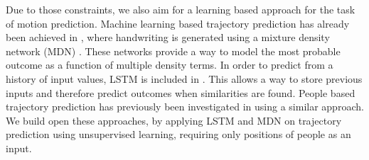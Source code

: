 Due to those constraints, we also aim for a learning based approach for the task of motion prediction.
Machine learning based trajectory prediction has already been achieved in \cite{graves2013generating}, where handwriting is generated using a mixture density network (MDN) \cite{bishop1994mixture}. 
These networks provide a way to model the most probable outcome as a function of multiple density terms. 
In order to predict from a history of input values, LSTM is included in \cite{hochreiter1997long}. 
This allows a way to store previous inputs and therefore predict outcomes when similarities are found. 
People based trajectory prediction has previously been investigated in \cite{alahi2016social} using a similar approach.
We build open these approaches, by applying LSTM and MDN on trajectory prediction using unsupervised learning, requiring only positions of people as an input.
